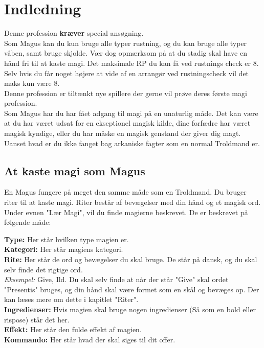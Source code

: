 
\chapter{Indledning}

Denne profession \textbf{kræver} special ansøgning.\\
Som Magus kan du kun bruge alle typer rustning, og du kan bruge alle typer våben, samt bruge skjolde. Vær dog opmærksom på at du stadig skal have en hånd fri til at kaste magi. Det maksimale RP du kan få ved rustnings check er 8. Selv hvis du får noget højere at vide af en arrangør ved rustningscheck vil det maks kun være 8.\\
Denne profession er tiltænkt nye spillere der gerne vil prøve deres første magi profession.\\

Som Magus har du har fået adgang til magi på en unaturlig måde. Det kan være at du har været udsat for en ekseptionel magisk kilde, dine forfædre har været magisk kyndige, eller du har måske en magisk genstand der giver dig magt. Uanset hvad er du ikke fanget bag arkaniske fagter som en normal Troldmand er.



\section{At kaste magi som Magus} 

En Magus fungere på meget den samme måde som en Troldmand. Du bruger riter til at kaste magi. Riter består af bevægelser med din hånd og et magisk ord. Under evnen "Lær Magi", vil du finde magierne beskrevet. De er beskrevet på følgende måde:
\begin{lærmagi*}
\textbf{Type:} Her står hvilken type magien er.\\
\textbf{Kategori:} Her står magiens kategori.\\
\textbf{Rite:} Her står de ord og bevægelser du skal bruge. De står på dansk, og du skal selv finde det rigtige ord.\\
\textit{Eksempel:} Give, Ild. Du skal selv finde at når der står "Give" skal ordet "Presentis" bruges, og din hånd skal være formet som en skål og bevæges op. Der kan læses mere om dette i kapitlet "Riter".\\
\textbf{Ingredienser:} Hvis magien skal bruge nogen ingredienser (Så som en bold eller rispose) står det her.\\
\textbf{Effekt:} Her står den fulde effekt af magien.\\
\textbf{Kommando:} Her står hvad der skal siges til dit offer.\\
\end{lærmagi*}


